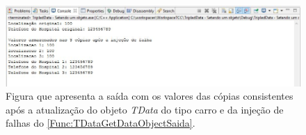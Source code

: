 \begin{figure}[H]
	\centering
	\includegraphics[width=1.0\textwidth]{figuras/tdataSetando.jpg}
	\caption[Figura que apresenta a saída com os valores das cópias consistentes após a atualização do objeto \textit{TData} do tipo carro e da injeção de falhas do \autoref{Func:TDataGetDataObjectSaida}.]{Figura que apresenta a saída com os valores das cópias consistentes após a atualização do objeto \textit{TData} do tipo carro e da injeção de falhas do \autoref{Func:TDataGetDataObjectSaida}.}
	\label{Img:tdataSetando}	
\end{figure}
